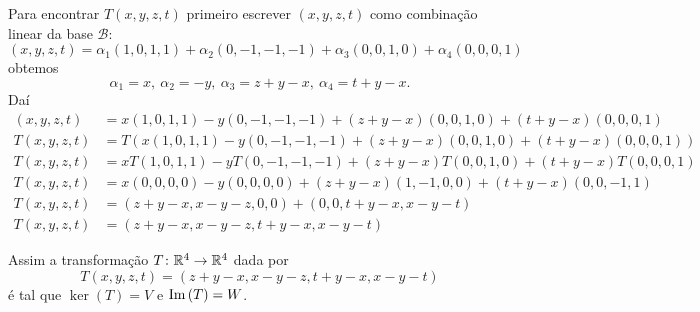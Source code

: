 \documentclass[12pt]{exam}
\begin{document}
    Para encontrar $T(x, y, z, t)$ primeiro escrever $(x, y, z, t)$ como combinação linear da base $\mathcal{B}$:
    \[
        (x, y, z, t) = \alpha_1(1, 0, 1, 1) + \alpha_2(0, -1, -1, -1) + \alpha_3(0, 0, 1, 0) + \alpha_4(0, 0, 0, 1)
    \]
    obtemos
    \[
        \alpha_1 = x,\ \alpha_2 = -y,\ \alpha_3 = z + y - x,\ \alpha_4 = t + y - x.
    \]
    Daí
    \begin{align*}
        (x, y, z, t) &= x(1, 0, 1, 1) - y(0, -1, -1, -1) + (z + y - x)(0, 0, 1, 0) + (t + y - x)(0, 0, 0, 1)\\
        T(x, y, z, t) &= T(x(1, 0, 1, 1) - y(0, -1, -1, -1) + (z + y - x)(0, 0, 1, 0) + (t + y - x)(0, 0, 0, 1))\\
        T(x, y, z, t) &= xT(1, 0, 1, 1) - yT(0, -1, -1, -1) + (z + y - x)T(0, 0, 1, 0) + (t + y - x)T(0, 0, 0, 1)\\
        T(x, y, z, t) &= x(0, 0, 0, 0) - y(0, 0, 0, 0) + (z + y - x)(1, -1, 0, 0) + (t + y - x)(0, 0, -1, 1)\\
        T(x, y, z, t) &= (z + y - x, x - y - z, 0, 0) + (0, 0, t + y - x, x - y - t)\\
        T(x, y, z, t) &= (z + y - x, x - y - z, t + y - x, x - y - t)
    \end{align*}

    Assim a transformação $T \colon \mathbb{R}^4 \to \mathbb{R}^4$ dada por
    \[
        T(x, y, z, t) = (z + y - x, x - y - z, t + y - x, x - y - t)
    \]
    é tal que $\ker(T) = V$ e ${\rm Im\,}(T) = W$.
\end{document}

